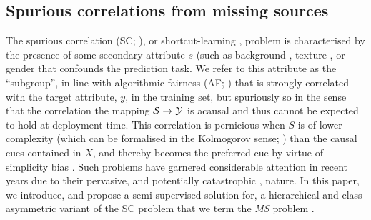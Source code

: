 \subsection{Spurious correlations from missing sources}\label{ssec:walkthrough}
The spurious correlation (\ac{SC}; \citealp{arjovsky2019invariant}), or shortcut-learning
\citep{valle2018deep, geirhos2020shortcut}, problem is characterised by the presence of some
secondary attribute \(s\) (such as background \citep{beery2018recognition}, texture
\citep{geirhos2018imagenet}, or gender \citep{sagawa2019distributionally, seyyed2020chexclusion}
that confounds the prediction task.
%
We refer to this attribute as the ``subgroup'', in line with algorithmic fairness (\ac{AF};
\citet{barocas-hardt-narayanan}) that is strongly correlated with the target attribute, \(y\), in
the training set, but spuriously so in the sense that the correlation the mapping \( {\mathcal{S}} \to {\mathcal{Y}} \)
is acausal and thus cannot be expected to hold at deployment time. 
%
This correlation is pernicious when \(S\) is of lower complexity (which can be formalised in the
Kolmogorov sense; \citet{scimeca2021shortcut}) than the causal cues contained in \(X\), and thereby
becomes the preferred cue by virtue of simplicity bias \citep{valle2018deep}. 
%
Such problems have garnered considerable attention in recent years \citep{liu2021just,
pezeshki2021gradient, SohDunAngGuetal20, krueger2021out} due to their pervasive, and potentially
catastrophic \citep{codevilla2019exploring, de2019causal, castro2020causality}, nature.
%
In this paper, we introduce, and propose a semi-supervised solution for, a hierarchical and
class-asymmetric variant of the \ac{SC} problem that we term the \emph{\acf{MS}} problem .

